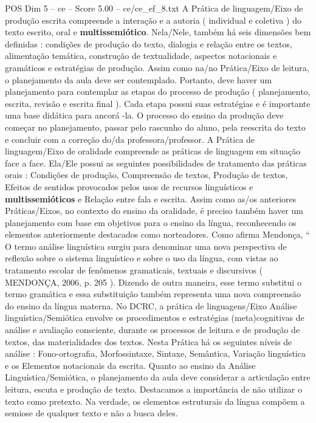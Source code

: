\begin{textsample}{POS Dim 5 – ce – Score 5.00 – ce/ce\_ef\_8.txt}
A Prática de linguagem/Eixo de produção escrita compreende a interação e a autoria ( individual e coletiva ) do texto escrito, oral e \textbf{multissemiótico}.
Nela/Nele, também há seis dimensões bem definidas : condições de produção do texto, dialogia e relação entre os textos, alimentação temática, construção de textualidade, aspectos notacionais e gramáticos e estratégias de produção.
Assim como na/no Prática/Eixo de leitura, o planejamento da aula deve ser contemplado.
Portanto, deve haver um planejamento para contemplar as etapas do processo de produção ( planejamento, escrita, revisão e escrita final ).
Cada etapa possui suas estratégias e é importante uma base didática para ancorá -la.
O processo do ensino da produção deve começar no planejamento, passar pelo rascunho do aluno, pela reescrita do texto e concluir com a correção do/da professora/professor.
A Prática de linguagem/Eixo de oralidade compreende as práticas de linguagem em situação face a face.
Ela/Ele possui as seguintes possibilidades de tratamento das práticas orais : Condições de produção, Compreensão de textos, Produção de textos, Efeitos de sentidos provocados pelos usos de recursos linguísticos e \textbf{multissemióticos} e Relação entre fala e escrita.
Assim como as/os anteriores Práticas/Eixos, no contexto do ensino da oralidade, é preciso também haver um planejamento com base em objetivos para o ensino da língua, reconhecendo os elementos anteriormente destacados como norteadores.
Como afirma Mendonça, “ O termo análise linguística surgiu para denominar uma nova perspectiva de reflexão sobre o sistema linguístico e sobre o uso da língua, com vistas ao tratamento escolar de fenômenos gramaticais, textuais e discursivos ( MENDONÇA, 2006, p. 205 ).
Dizendo de outra maneira, esse termo substitui o termo gramática e essa substituição também representa uma nova compreensão do ensino da língua materna.
No DCRC, a prática de linguagens/Eixo Análise linguística/Semiótica envolve os procedimentos e estratégias (meta)cognitivas de análise e avaliação consciente, durante os processos de leitura e de produção de textos, das materialidades dos textos.
Nesta Prática há os seguintes níveis de análise : Fono-ortografia, Morfossintaxe, Sintaxe, Semântica, Variação linguística e os Elementos notacionais da escrita.
Quanto ao ensino da Análise Linguística/Semiótica, o planejamento da aula deve considerar a articulação entre leitura, escuta e produção de texto.
Destacamos a importância de não utilizar o texto como pretexto.
Na verdade, os elementos estruturais da língua compõem a semiose de qualquer texto e não a busca deles.

\end{textsample}
